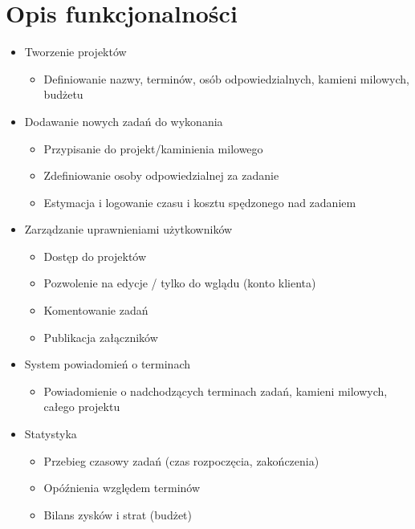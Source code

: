\documentclass[wide,a4paper,titlepage,12pt] {article}
\begin{document}
  \section{Opis funkcjonalności}
  \begin{itemize}
    \item Tworzenie projektów
      \begin{itemize}
        \item Definiowanie nazwy, terminów, osób odpowiedzialnych, kamieni milowych, budżetu
      \end{itemize}

    \item Dodawanie nowych zadań do wykonania
      \begin{itemize}
        \item Przypisanie do projekt/kaminienia milowego
        \item Zdefiniowanie osoby odpowiedzialnej za zadanie
        \item Estymacja i logowanie czasu i kosztu spędzonego nad zadaniem
      \end{itemize}

    \item Zarządzanie uprawnieniami użytkowników
      \begin{itemize}
        \item Dostęp do projektów
        \item Pozwolenie na edycje / tylko do wglądu (konto klienta)
        \item Komentowanie zadań
        \item Publikacja załączników
      \end{itemize}

    \item System powiadomień o terminach
      \begin{itemize}
        \item Powiadomienie o nadchodzących terminach zadań, kamieni milowych, całego projektu
      \end{itemize}

    \item Statystyka
      \begin{itemize}
        \item Przebieg czasowy zadań (czas rozpoczęcia, zakończenia)
        \item Opóźnienia względem terminów
        \item Bilans zysków i strat (budżet)
      \end{itemize}

  \end{itemize}
\end{document}
